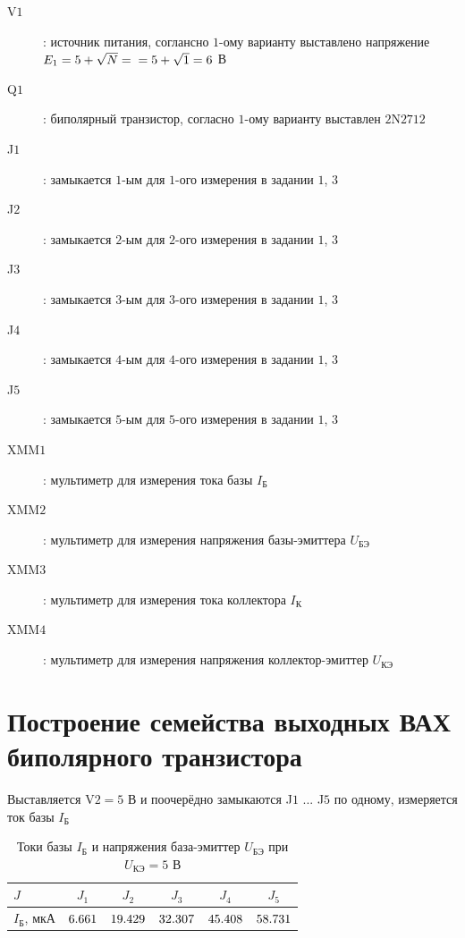 \documentclass[12pt,a4paper]{article}
\newcommand{\CalcTwo}  [1]{\fpeval{round((#1),2)}}
\def\VariantN{1}          					 %
\def\BJTName{$2$N$2712$}
\def\IbOne  {\fpeval{6.661 * 10^{-6}}} %
\def\IbTwo  {\fpeval{19.429 * 10^{-6}}} %
\def\IbThree{\fpeval{32.307 * 10^{-6}}} %
\def\IbFour {\fpeval{45.408 * 10^{-6}}} %
\def\IbFive {\fpeval{58.731 * 10^{-6}}} %
\edef\Eone{\CalcTwo{5 + sqrt(\VariantN)}}   %
\begin{document}
\begin{description}
	\item[V$1$]: источник питания, соглансно $\VariantN$-ому варианту выставлено напряжение $E_1 = 5 + \sqrt{N} = \\ = 5 + \sqrt{\VariantN} = \Eone$ В
	\item[Q$1$]: биполярный транзистор, согласно $\VariantN$-ому варианту выставлен \BJTName
	\item[J$1$]: замыкается $1$-ым для $1$-ого измерения в задании $1$, $3$
	\item[J$2$]: замыкается $2$-ым для $2$-ого измерения в задании $1$, $3$
	\item[J$3$]: замыкается $3$-ым для $3$-ого измерения в задании $1$, $3$
	\item[J$4$]: замыкается $4$-ым для $4$-ого измерения в задании $1$, $3$
	\item[J$5$]: замыкается $5$-ым для $5$-ого измерения в задании $1$, $3$
	\item[XMM$1$]: мультиметр для измерения тока базы $I_\text{Б}$
	\item[XMM$2$]: мультиметр для измерения напряжения базы-эмиттера $U_\text{БЭ}$
	\item[XMM$3$]: мультиметр для измерения тока коллектора $I_\text{К}$
	\item[XMM$4$]: мультиметр для измерения напряжения коллектор-эмиттер $U_\text{КЭ}$
\end{description}

\section{Построение семейства выходных ВАХ биполярного транзистора}
Выставляется  V$2 = 5$ В и поочерёдно замыкаются J$1$ ... J$5$ по одному, измеряется ток базы $I_\text{Б}$
\begin{table}[H]
\centering
\small
\begin{tabularx}{\textwidth}{|p{3cm}|C|C|C|C|C|}
	\hline
	$J$ & $J_1$ & $J_2$ & $J_3$ & $J_4$ & $J_5$ \\
	\hline
	$I_\text{Б}$, мкА & $\fpeval{\IbOne * 10^{6}}$ & $\fpeval{\IbTwo * 10^{6}}$ & $\fpeval{\IbThree * 10^{6}}$ & $\fpeval{\IbFour * 10^{6}}$ & $\fpeval{\IbFive * 10^{6}}$ \\
	\hline
\end{tabularx}
\caption{Токи базы $I_\text{Б}$ и напряжения база-эмиттер $U_\text{БЭ}$ при $U_\text{КЭ}=5$ В}
\end{table}
\end{document}
